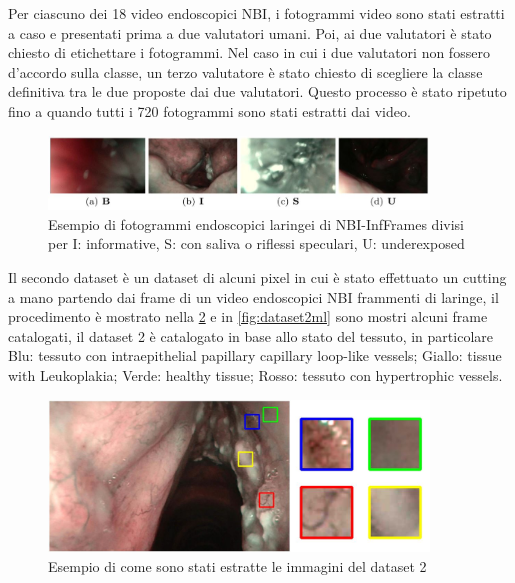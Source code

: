 Per ciascuno dei 18 video endoscopici NBI, i fotogrammi video sono stati estratti a caso e
presentati prima a due valutatori umani. Poi, ai due valutatori è stato chiesto di etichettare i fotogrammi. Nel caso in cui i due
valutatori non fossero d'accordo sulla classe, un terzo valutatore è stato
chiesto di scegliere la classe definitiva tra le due proposte
dai due valutatori. Questo processo è stato ripetuto fino a quando tutti i
720 fotogrammi sono stati estratti dai video.

\begin{figure}[ht]
    \centering
    \includegraphics[width=0.9\textwidth]{introduzione/Larynge.jpg}
    \caption{Esempio di fotogrammi endoscopici laringei di NBI-InfFrames divisi per I: informative, S: con
    saliva o riflessi speculari,
    U: underexposed}
    \label{fig:larynges}
\end{figure}

Il secondo dataset è un dataset di alcuni pixel in cui è stato effettuato un cutting a mano partendo dai frame di  un video endoscopici NBI frammenti di laringe, il procedimento è mostrato nella \cref{fig:dataset2}  e in \cref{fig:dataset2ml} sono mostri alcuni frame catalogati, il dataset 2 è catalogato in base allo stato del tessuto, in particolare Blu: tessuto con intraepithelial papillary capillary loop-like vessels; Giallo: tissue with Leukoplakia;
Verde: healthy tissue; Rosso: tessuto con hypertrophic vessels.\cite{}



\begin{figure}[ht]
    \centering
    \includegraphics[width=0.9\textwidth]{introduzione/dataset-2.JPG}
    \caption{Esempio di come sono stati estratte le immagini del dataset 2}
    \label{fig:dataset2}
\end{figure}

